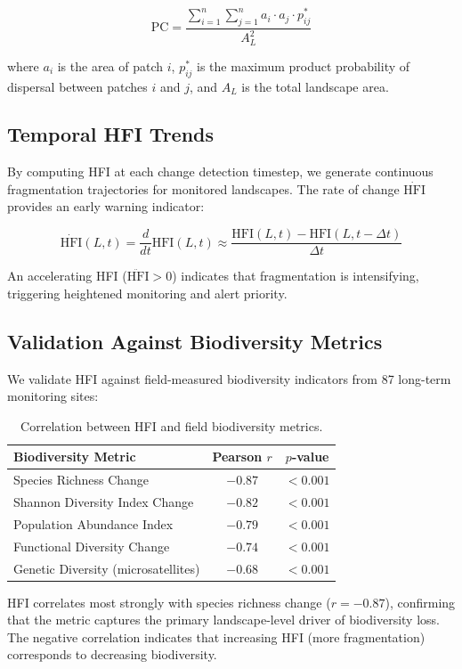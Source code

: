 \begin{equation}
    \text{PC} = \frac{\sum_{i=1}^{n} \sum_{j=1}^{n} a_i \cdot a_j \cdot p_{ij}^*}{A_L^2}
\end{equation}

\noindent where $a_i$ is the area of patch $i$, $p_{ij}^*$ is the maximum product probability of dispersal between patches $i$ and $j$, and $A_L$ is the total landscape area.

\subsection{Temporal HFI Trends}

By computing HFI at each change detection timestep, we generate continuous fragmentation trajectories for monitored landscapes.
The rate of change $\dot{\text{HFI}}$ provides an early warning indicator:

\begin{equation}
    \dot{\text{HFI}}(L, t) = \frac{d}{dt}\text{HFI}(L, t) \approx \frac{\text{HFI}(L, t) - \text{HFI}(L, t - \Delta t)}{\Delta t}
\end{equation}

An accelerating HFI ($\ddot{\text{HFI}} > 0$) indicates that fragmentation is intensifying, triggering heightened monitoring and alert priority.

\subsection{Validation Against Biodiversity Metrics}

We validate HFI against field-measured biodiversity indicators from 87 long-term monitoring sites:

\begin{table}[H]
\centering
\caption{Correlation between HFI and field biodiversity metrics.}
\label{tab:hfi_validation}
\begin{tabular}{@{}lcc@{}}
\toprule
\textbf{Biodiversity Metric} & \textbf{Pearson $r$} & \textbf{$p$-value} \\
\midrule
Species Richness Change & $-0.87$ & $< 0.001$ \\
Shannon Diversity Index Change & $-0.82$ & $< 0.001$ \\
Population Abundance Index & $-0.79$ & $< 0.001$ \\
Functional Diversity Change & $-0.74$ & $< 0.001$ \\
Genetic Diversity (microsatellites) & $-0.68$ & $< 0.001$ \\
\bottomrule
\end{tabular}
\end{table}

HFI correlates most strongly with species richness change ($r = -0.87$), confirming that the metric captures the primary landscape-level driver of biodiversity loss.
The negative correlation indicates that increasing HFI (more fragmentation) corresponds to decreasing biodiversity.

